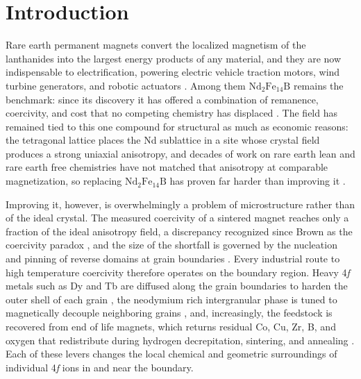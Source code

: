 \documentclass[final,1p,times]{elsarticle}
\DeclareRobustCommand{\rev}[1]{{\color{revcolor}#1}}
\newcommand{\ndfeb}{\mathrm{Nd_2Fe_{14}B}}
\begin{document}
\section{Introduction}
Rare earth permanent magnets convert the localized magnetism of the lanthanides into the largest energy products of any material, and they are now indispensable to electrification, powering electric vehicle traction motors, wind turbine generators, and robotic actuators \cite{gutfleisch2011,coey2020,skomski1999}. Among them $\ndfeb$ remains the benchmark: since its discovery it has offered a combination of remanence, coercivity, and cost that no competing chemistry has displaced \cite{sagawa1984,herbst1991}. The field has remained tied to this one compound for structural as much as economic reasons: the tetragonal lattice places the Nd sublattice in a site whose crystal field produces a strong uniaxial anisotropy, and decades of work on rare earth lean and rare earth free chemistries have not matched that anisotropy at comparable magnetization, so replacing $\ndfeb$ has proven far harder than improving it \cite{coey2020,skomski1999}.

Improving it, however, is overwhelmingly a problem of microstructure rather than of the ideal crystal. \rev{The measured coercivity of a sintered magnet reaches only a fraction of the ideal anisotropy field, a discrepancy recognized since Brown as the coercivity paradox \cite{brown1945}, and the size of the shortfall is governed by the nucleation and pinning of reverse domains at grain boundaries \cite{kronmuller1987,kronmuller2003}.} Every industrial route to high temperature coercivity therefore operates on the boundary region. Heavy 4\textit{f} metals such as Dy and Tb are diffused along the grain boundaries to harden the outer shell of each grain \cite{hono2012,sepehriamin2013,sepehriamin2023}, the neodymium rich intergranular phase is tuned to magnetically decouple neighboring grains \cite{hono2012}, and, increasingly, the feedstock is recovered from end of life magnets, which returns residual Co, Cu, Zr, B, and oxygen that redistribute during hydrogen decrepitation, sintering, and annealing \cite{binnemans2013,yang2017,zakotnik2025a,zakotnik2025b}. Each of these levers changes the local chemical and geometric surroundings of individual 4\textit{f} ions in and near the boundary.
\end{document}
